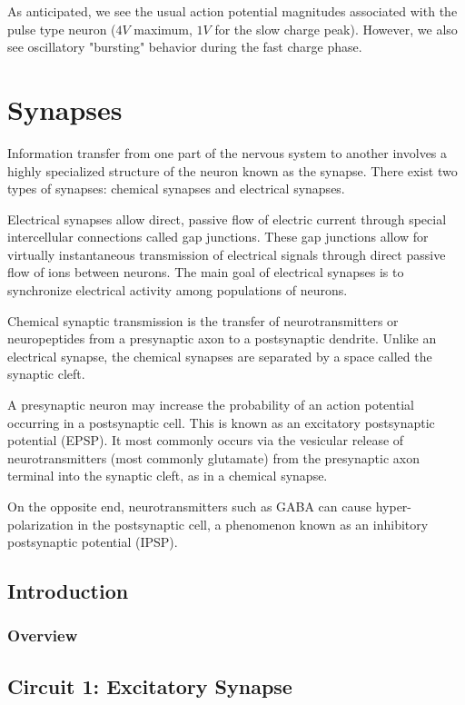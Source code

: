 \documentclass[12]{book}
\newcommand\0{\mathbf{0}}
\newcommand\<{\langle}
\renewcommand\>{\rangle}
\begin{document}
As anticipated, we see the usual action potential magnitudes associated with the pulse type neuron ($4V$ maximum, $1V$ for the slow charge peak). However, we also see oscillatory "bursting" behavior during the fast charge phase.

\chapter{Synapses}

Information transfer from one part of the nervous system to another involves a highly specialized structure of the neuron known as the synapse. There exist two types of synapses: chemical synapses and electrical synapses. 

Electrical synapses allow direct, passive flow of electric current through special intercellular connections called gap junctions. These gap junctions allow for virtually instantaneous transmission of electrical signals through direct passive flow of ions between neurons. The main goal of electrical synapses is to synchronize electrical activity among populations of neurons. 

Chemical synaptic transmission is the transfer of neurotransmitters or neuropeptides from a presynaptic axon to a postsynaptic dendrite. Unlike an electrical synapse, the chemical synapses are separated by a space called the synaptic cleft.

A presynaptic neuron may increase the probability of an action potential occurring in a postsynaptic cell. This is known as an excitatory postsynaptic potential (EPSP). It most commonly occurs via the vesicular release of neurotransmitters (most commonly glutamate) from the presynaptic axon terminal into the synaptic cleft, as in a chemical synapse.

On the opposite end, neurotransmitters such as GABA can cause hyper-polarization in the postsynaptic cell, a phenomenon known as an inhibitory postsynaptic potential (IPSP).

\section{Introduction}

\subsection{Overview}

\section{Circuit 1: Excitatory Synapse}
\end{document}
